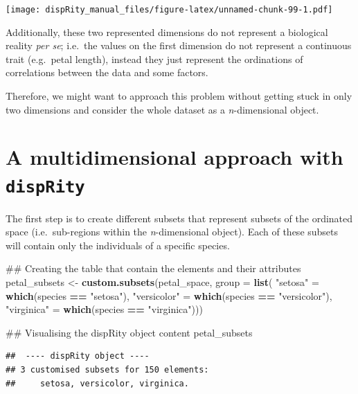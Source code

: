 \documentclass[]{book}
\newenvironment{Shaded}{\begin{snugshade}}{\end{snugshade}}
\newcommand{\KeywordTok}[1]{\textcolor[rgb]{0.13,0.29,0.53}{\textbf{#1}}}
\newcommand{\DataTypeTok}[1]{\textcolor[rgb]{0.13,0.29,0.53}{#1}}
\newcommand{\StringTok}[1]{\textcolor[rgb]{0.31,0.60,0.02}{#1}}
\newcommand{\OperatorTok}[1]{\textcolor[rgb]{0.81,0.36,0.00}{\textbf{#1}}}
\newcommand{\NormalTok}[1]{#1}
\theoremstyle{definition}
\theoremstyle{definition}
\theoremstyle{remark}
\begin{document}
\texttt{[image: dispRity\_manual\_files/figure-latex/unnamed-chunk-99-1.pdf]}

Additionally, these two represented dimensions do not represent a
biological reality \emph{per se}; i.e.~the values on the first dimension
do not represent a continuous trait (e.g.~petal length), instead they
just represent the ordinations of correlations between the data and some
factors.

Therefore, we might want to approach this problem without getting stuck
in only two dimensions and consider the whole dataset as a
\emph{n}-dimensional object.

\section{\texorpdfstring{A multidimensional approach with
\texttt{dispRity}}{A multidimensional approach with dispRity}}\label{a-multidimensional-approach-with-disprity}

The first step is to create different subsets that represent subsets of
the ordinated space (i.e.~sub-regions within the \emph{n}-dimensional
object). Each of these subsets will contain only the individuals of a
specific species.

\begin{Shaded}
\begin{Highlighting}[]
\NormalTok{## Creating the table that contain the elements and their attributes}
\NormalTok{petal_subsets <-}\StringTok{ }\KeywordTok{custom.subsets}\NormalTok{(petal_space, }\DataTypeTok{group =} \KeywordTok{list}\NormalTok{(}
                                \StringTok{"setosa"}\NormalTok{ =}\StringTok{ }\KeywordTok{which}\NormalTok{(species }\OperatorTok{==}\StringTok{ "setosa"}\NormalTok{),}
                                \StringTok{"versicolor"}\NormalTok{ =}\StringTok{ }\KeywordTok{which}\NormalTok{(species }\OperatorTok{==}\StringTok{ "versicolor"}\NormalTok{),}
                                \StringTok{"virginica"}\NormalTok{ =}\StringTok{ }\KeywordTok{which}\NormalTok{(species }\OperatorTok{==}\StringTok{ "virginica"}\NormalTok{)))}

\NormalTok{## Visualising the dispRity object content}
\NormalTok{petal_subsets}
\end{Highlighting}
\end{Shaded}

\begin{verbatim}
##  ---- dispRity object ---- 
## 3 customised subsets for 150 elements:
##     setosa, versicolor, virginica.
\end{verbatim}
\end{document}
